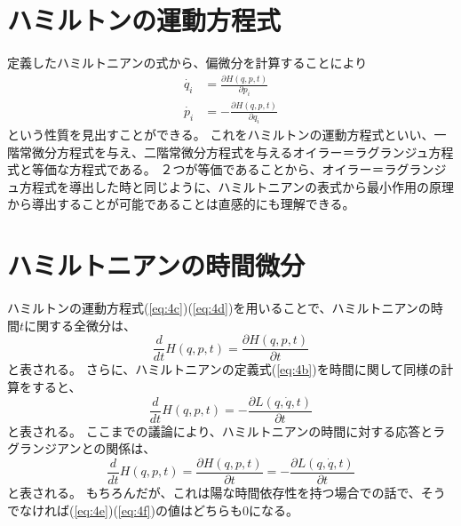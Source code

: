 \documentclass[a4paper]{jsreport}
\begin{document}
        \section{ハミルトンの運動方程式}
            定義したハミルトニアンの式から、偏微分を計算することにより
            \begin{align}
                \dot{q_i} &= \frac{\partial H(q, p ,t)}{\partial p_i} \label{eq:4c} \\
                \dot{p_i} &= - \frac{\partial H(q, p ,t)}{\partial q_i} \label{eq:4d}
            \end{align}
            という性質を見出すことができる。
            これをハミルトンの運動方程式といい、一階常微分方程式を与え、二階常微分方程式を与えるオイラー＝ラグランジュ方程式と等価な方程式である。
            ２つが等価であることから、オイラー＝ラグランジュ方程式を導出した時と同じように、ハミルトニアンの表式から最小作用の原理から導出することが可能であることは直感的にも理解できる。

        \section{ハミルトニアンの時間微分}
            ハミルトンの運動方程式(\ref{eq:4c})(\ref{eq:4d})を用いることで、ハミルトニアンの時間$t$に関する全微分は、
            \begin{equation} \label{eq:4e}
                \frac{d}{dt} H(q, p ,t) = \frac{\partial H(q, p, t)}{\partial t}
            \end{equation}
            と表される。
            さらに、ハミルトニアンの定義式(\ref{eq:4b})を時間に関して同様の計算をすると、
            \begin{equation} \label{eq:4f}
                \frac{d}{dt} H(q, p ,t) = - \frac{\partial L(q, \dot{q}, t)}{\partial t}
            \end{equation}
            と表される。
            ここまでの議論により、ハミルトニアンの時間に対する応答とラグランジアンとの関係は、
            \begin{equation}
                \frac{d}{dt} H(q, p ,t) = \frac{\partial H(q, p, t)}{\partial t} = - \frac{\partial L(q, \dot{q}, t)}{\partial t}
            \end{equation}
            と表される。
            もちろんだが、これは陽な時間依存性を持つ場合での話で、そうでなければ(\ref{eq:4e})(\ref{eq:4f})の値はどちらも$0$になる。
       
\end{document}
